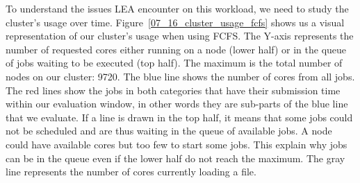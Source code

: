 \documentclass[conference,10pt]{IEEEtran}
\begin{document}
To understand the issues LEA encounter on this workload, we need to study the cluster's usage over time.
Figure~\ref{07_16_cluster_usage_fcfs} shows us a visual representation of 
our cluster's usage when using FCFS.
The Y-axis represents the number of requested cores either running on a node (lower half) or in the queue of jobs waiting to be executed (top half). The maximum is the total number of nodes on our cluster: 9720.
The blue line shows the number of cores from all jobs.
The red lines show the jobs in both categories that have their submission
time within our evaluation window, in other words they are sub-parts of the blue line
that we evaluate.
If a line is drawn in the top half, it means that some jobs could not be scheduled
and are thus waiting in the queue of available jobs. 
A node could have available cores but too few to start some jobs.
This explain why jobs can be in the queue even if the lower half do not reach the maximum.
The gray line represents the number of cores currently loading a file.
\end{document}
